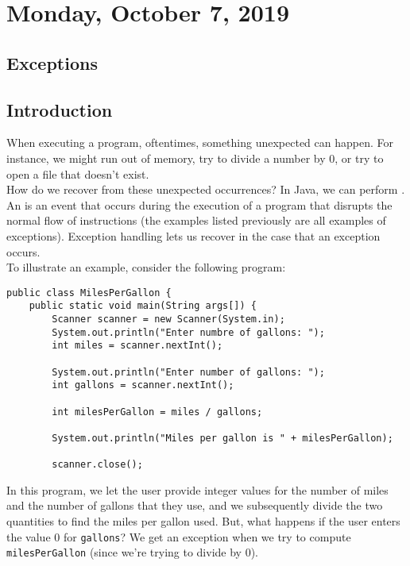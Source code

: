 \section{Monday, October 7, 2019}

\subsection{Exceptions}

\subsection{Introduction}


When executing a program, oftentimes, something unexpected can happen. For instance, we might run out of memory, try to divide a number by $0$, or try to open a file that doesn't exist. \\

How do we recover from these unexpected occurrences? In Java, we can perform  . An  is an event that occurs during the execution of a program that disrupts the normal flow of instructions (the examples listed previously are all examples of exceptions). Exception handling lets us recover in the case that an exception occurs. \\


To illustrate an example, consider the following program:

\begin{lstlisting}
public class MilesPerGallon {
    public static void main(String args[]) {
        Scanner scanner = new Scanner(System.in);
        System.out.println("Enter numbre of gallons: ");
        int miles = scanner.nextInt();
        
        System.out.println("Enter number of gallons: ");
        int gallons = scanner.nextInt();
        
        int milesPerGallon = miles / gallons;
        
        System.out.println("Miles per gallon is " + milesPerGallon);
        
        scanner.close();
\end{lstlisting}

In this program, we let the user provide integer values for the number of miles and the number of gallons that they use, and we subsequently divide the two quantities to find the miles per gallon used. But, what happens if the user enters the value $0$ for \verb!gallons!? We get an exception when we try to compute \verb!milesPerGallon! (since we're trying to divide by $0$). \\

